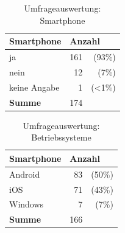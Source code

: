 \begin{table}[H]
\begin{center}
\begin{footnotesize}
\begin{tabular}{| l | r  r |}  \hline                       
  \textbf{Smartphone}              & \multicolumn{2}{|l|}{\textbf{Anzahl}}   \\ \hline 
  ja        &  161 &   (93\%)  \\  \hline  
  nein        &  12  &   (7\%)  \\  \hline  
  keine Angabe    &  1   &   (<1\%)  \\  \hline  
  \textbf{Summe}  & 174  &   \\  \hline  
\end{tabular}
\end{footnotesize}
\caption{Umfrageauswertung: Smartphone}
\label{tab:smartphone}
\end{center}
\end{table}

\begin{table}[H]
\begin{center}
\begin{footnotesize}
\begin{tabular}{| l | r  r |}  \hline                       
  \textbf{Smartphone}              & \multicolumn{2}{|l|}{\textbf{Anzahl}}   \\ \hline 
  Android    &  83 &   (50\%)  \\  \hline  
  iOS        &  71  &   (43\%)  \\  \hline  
  Windows    &  7   &   (7\%)  \\  \hline  
  \textbf{Summe}  & 166  &   \\  \hline  
\end{tabular}
\end{footnotesize}
\caption{Umfrageauswertung: Betriebssysteme}
\label{tab:smartphone}
\end{center}
\end{table}

